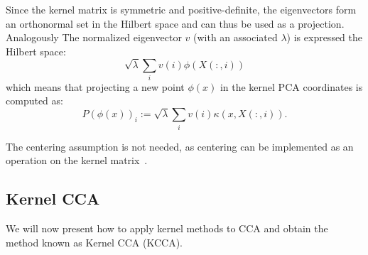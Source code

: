 Since the kernel matrix is symmetric and positive-definite, the eigenvectors form an orthonormal set in the Hilbert space and
can thus be used as a projection. Analogously 
 The normalized eigenvector $v$ (with an associated $\lambda$) is expressed the Hilbert space:
$$ \sqrt{\lambda} \sum_i v(i) \phi(X(:,i))$$
which means that projecting a new point $\phi(x)$ in the kernel PCA coordinates is computed as:
$$P(\phi(x))_i := \sqrt{\lambda} \sum_i v(i) \kappa(x, X(:,i)).$$

The centering assumption is not needed, as centering can be implemented as an operation on the kernel matrix~\cite{shawe-taylor04kernel}.

\subsection{Kernel CCA}

We will now present how to apply kernel methods to CCA and obtain the method known as Kernel CCA (KCCA).





